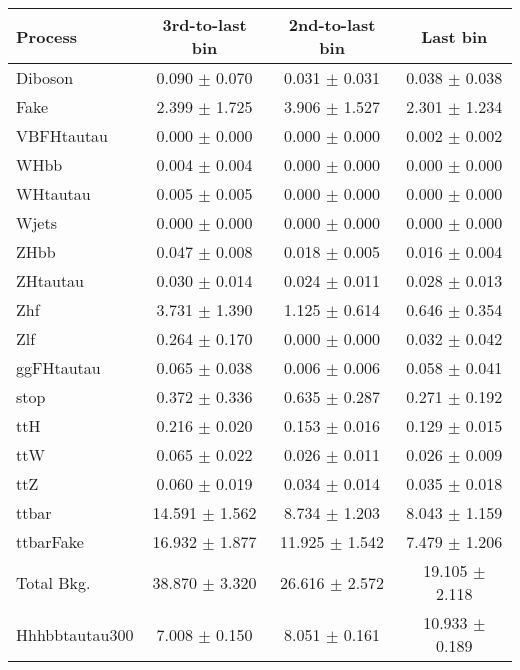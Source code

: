 \begin{tabular}{lccc}
  \toprule
  Process & 3rd-to-last bin & 2nd-to-last bin & Last bin \\
  \midrule
  Diboson &	0.090	$\pm$ 0.070	& 0.031	$\pm$ 0.031	& 0.038	$\pm$ 0.038 \\
  Fake &	2.399	$\pm$ 1.725	& 3.906	$\pm$ 1.527	& 2.301	$\pm$ 1.234 \\
  VBFHtautau &	0.000	$\pm$ 0.000	& 0.000	$\pm$ 0.000	& 0.002	$\pm$ 0.002 \\
  WHbb &	0.004	$\pm$ 0.004	& 0.000	$\pm$ 0.000	& 0.000	$\pm$ 0.000 \\
  WHtautau &	0.005	$\pm$ 0.005	& 0.000	$\pm$ 0.000	& 0.000	$\pm$ 0.000 \\
  Wjets &	0.000	$\pm$ 0.000	& 0.000	$\pm$ 0.000	& 0.000	$\pm$ 0.000 \\
  ZHbb &	0.047	$\pm$ 0.008	& 0.018	$\pm$ 0.005	& 0.016	$\pm$ 0.004 \\
  ZHtautau &	0.030	$\pm$ 0.014	& 0.024	$\pm$ 0.011	& 0.028	$\pm$ 0.013 \\
  Zhf &		3.731	$\pm$ 1.390	& 1.125	$\pm$ 0.614	& 0.646	$\pm$ 0.354 \\
  Zlf &		0.264	$\pm$ 0.170	& 0.000	$\pm$ 0.000	& 0.032	$\pm$ 0.042 \\
  ggFHtautau &	0.065	$\pm$ 0.038	& 0.006	$\pm$ 0.006	& 0.058	$\pm$ 0.041 \\
  stop &	0.372	$\pm$ 0.336	& 0.635	$\pm$ 0.287	& 0.271	$\pm$ 0.192 \\
  ttH &		0.216	$\pm$ 0.020	& 0.153	$\pm$ 0.016	& 0.129	$\pm$ 0.015 \\
  ttW &		0.065	$\pm$ 0.022	& 0.026	$\pm$ 0.011	& 0.026	$\pm$ 0.009 \\
  ttZ &		0.060	$\pm$ 0.019	& 0.034	$\pm$ 0.014	& 0.035	$\pm$ 0.018 \\
  ttbar &	14.591	$\pm$ 1.562	& 8.734	$\pm$ 1.203	& 8.043	$\pm$ 1.159 \\
  ttbarFake &	16.932	$\pm$ 1.877	& 11.925	$\pm$ 1.542	& 7.479	$\pm$ 1.206 \\
  \midrule
  Total Bkg. &  38.870  $\pm$ 3.320	& 26.616 $\pm$ 2.572 & 19.105 $\pm$ 2.118 \\
  \midrule
  Hhhbbtautau300 &	7.008	$\pm$ 0.150	& 8.051	$\pm$ 0.161	& 10.933	$\pm$ 0.189 \\
  \bottomrule
\end{tabular}
